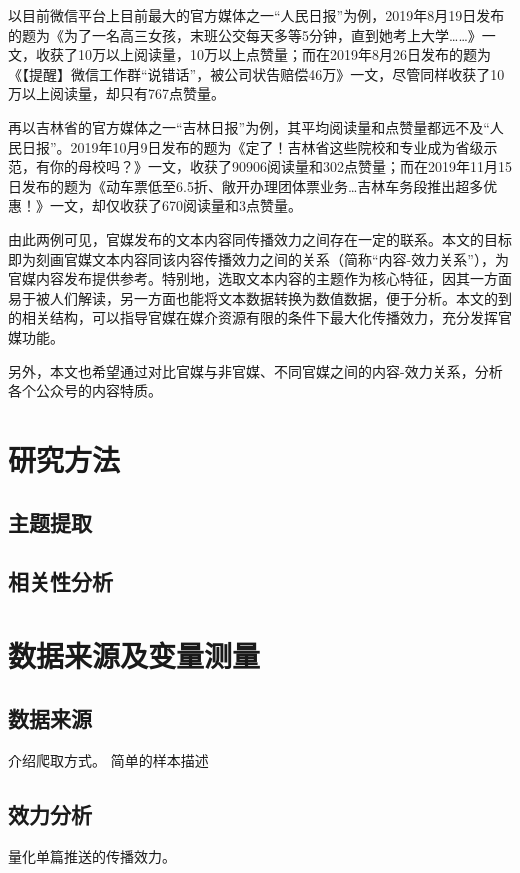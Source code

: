 \documentclass[a4paper,12pt]{article}
\begin{document}
    以目前微信平台上目前最大的官方媒体之一“人民日报”为例，2019年8月19日发布的题为《为了一名高三女孩，末班公交每天多等5分钟，直到她考上大学……》一文，收获了10万以上阅读量，10万以上点赞量；而在2019年8月26日发布的题为《【提醒】微信工作群“说错话”，被公司状告赔偿46万》一文，尽管同样收获了10万以上阅读量，却只有767点赞量。
    
    再以吉林省的官方媒体之一“吉林日报”为例，其平均阅读量和点赞量都远不及“人民日报”。2019年10月9日发布的题为《定了！吉林省这些院校和专业成为省级示范，有你的母校吗？》一文，收获了90906阅读量和302点赞量；而在2019年11月15日发布的题为《动车票低至6.5折、敞开办理团体票业务…吉林车务段推出超多优惠！》一文，却仅收获了670阅读量和3点赞量。
    
    由此两例可见，官媒发布的文本内容同传播效力之间存在一定的联系。本文的目标即为刻画官媒文本内容同该内容传播效力之间的关系（简称“内容-效力关系”），为官媒内容发布提供参考。特别地，选取文本内容的主题作为核心特征，因其一方面易于被人们解读，另一方面也能将文本数据转换为数值数据，便于分析。本文的到的相关结构，可以指导官媒在媒介资源有限的条件下最大化传播效力，充分发挥官媒功能。

    另外，本文也希望通过对比官媒与非官媒、不同官媒之间的内容-效力关系，分析各个公众号的内容特质。
    \section{研究方法}
    
    \subsection{主题提取}
    \subsection{相关性分析}
    \section{数据来源及变量测量}
    \subsection{数据来源}
    介绍爬取方式。
    简单的样本描述
    \subsection{效力分析}
    量化单篇推送的传播效力。
\end{document}
